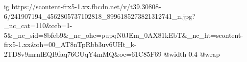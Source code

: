  
 
 
 
 

\ifcmt
  ig https://scontent-frx5-1.xx.fbcdn.net/v/t39.30808-6/241907194_4562805737102818_8996185273821312741_n.jpg?_nc_cat=110&ccb=1-5&_nc_sid=8bfeb9&_nc_ohc=pupqN0JEm_0AX81kEbT&_nc_ht=scontent-frx5-1.xx&oh=00_AT8nTpRbb3uv6UHt_k-2TD8v9mrnlEQI9faq76GUqY4mMQ&oe=61C85F69
  @width 0.4
  @wrap 
\fi
